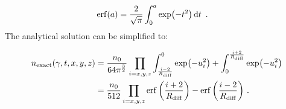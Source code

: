 \begin{equation}
    \begin{aligned}
    \erf(a)&=\frac{2}{\sqrt{\pi}}\int_{0}^{a}\exp(-t^2)\dd{t}\text{ .} 
    \end{aligned}
\end{equation}
\noindent The analytical solution can be simplified to:

\begin{equation}
	\begin{aligned}
		n_\text{exact}\qty(\gamma,t,x,y,z)&=\frac{n_0}{64\pi^{\frac{3}{2}}}\prod_{i=x,y,z}\int_{\frac{i-2}{R_\text{diff}}}^0\exp(-u_i^2) + \int_{0}^{\frac{i+2}{R_\text{diff}}}\exp(-u_i^2) \\
		&=\frac{n_0}{512} \prod_{i=x,y,z} \erf\qty(\frac{i+2}{R_\text{diff}})-\erf\qty(\frac{i-2}{R_\text{diff}})\text{ .} 
	\end{aligned} \label{eq:chapter_9_multizone_diff_exact_sol}
\end{equation} 

